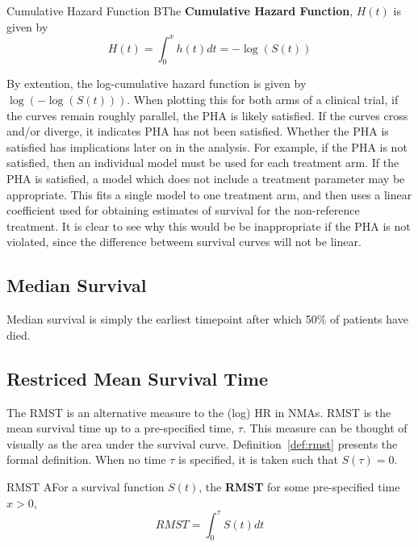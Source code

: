 \begin{definition}[label=cumHazFun]{Cumulative Hazard Function}
    BThe \textbf{Cumulative Hazard Function}, $H(t)$ is given by 
    \begin{equation}
        H(t) = \int_{0}^{x}h(t)dt = -\log(S(t))  
    \end{equation}
\end{definition}

By extention, the log-cumulative hazard function is given by $\log(-\log(S(t)))$. When plotting this for both arms of a clinical trial, if the curves remain roughly parallel, the PHA is likely satisfied. If the curves cross and/or diverge, it indicates PHA has not been satisfied. Whether the PHA is satisfied has implications later on in the analysis. For example, if the PHA is not satisfied, then an individual model must be used for each treatment arm. If the PHA is satisfied, a model which does not include a treatment parameter may be appropriate. This fits a single model to one treatment arm, and then uses a linear coefficient used for obtaining estimates of survival for the non-reference treatment. It is clear to see why this would be be inappropriate if the PHA is not violated, since the difference betweem survival curves will not be linear. 

\subsection{Median Survival}
Median survival is simply the earliest timepoint after which 50\% of patients have died. 

\subsection{Restriced Mean Survival Time}
The RMST is an alternative measure to the (log) HR in NMAs. RMST is the mean survival time up to a pre-specified time, $\tau$. This measure can be thought of visually as the area under the survival curve. Definition~\ref{def:rmst} presents the formal definition. When no time $\tau$ is specified, it is taken such that $S(\tau) = 0$.

\begin{definition}[label=def:rmst]{RMST}
    AFor a survival function $S(t)$, the \textbf{RMST} for some pre-specified time $x > 0$,
    \begin{equation}
        RMST = \int_{0}^{\tau} S(t)dt
    \end{equation}
\end{definition}


